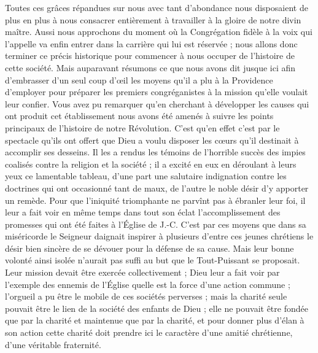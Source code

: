 Toutes ces grâces répandues sur nous avec tant d'abondance nous disposaient de plus en plus à nous consacrer entièrement à travailler à la gloire de notre divin maître. Aussi nous approchons du moment où la Congrégation fidèle à la voix qui l'appelle va enfin entrer dans la carrière qui lui est réservée ; nous allons donc terminer ce précis historique pour commencer à nous occuper de l'histoire de cette société. Mais auparavant résumons ce que nous avons dit jusque ici afin d'embrasser d'un seul coup d'œil les moyens qu'il a plu à la Providence d'employer pour préparer les
premiers congréganistes à la mission qu'elle voulait leur confier. Vous avez pu remarquer qu'en cherchant à développer les causes qui ont produit cet établissement nous avons été amenés à suivre les points principaux de l'histoire de notre Révolution. C'est qu'en effet c'est par le spectacle qu'ils ont offert que Dieu a voulu disposer les cœurs qu'il destinait à accomplir ses desseins. Il les a rendus les témoins de l'horrible succès des impies coalisés contre la religion et la société ; il a excité en eux en déroulant à leurs yeux ce lamentable tableau, d'une part une salutaire indignation contre les doctrines qui ont occasionné tant de maux, de l'autre le noble désir d'y apporter un remède. Pour que l'iniquité triomphante ne parvînt pas à ébranler leur foi, il leur a fait voir en même temps dans tout son éclat l'accomplissement des promesses qui ont été faites à l'Église de J.-C. C'est par ces moyens que dans sa miséricorde le Seigneur daignait inspirer à plusieurs d'entre ces jeunes chrétiens le désir bien sincère de se dévouer pour la défense de sa cause. Mais leur bonne volonté ainsi isolée n'aurait pas suffi au but que le Tout-Puissant se proposait. Leur mission devait être exercée collectivement ; Dieu leur a fait voir par l'exemple des ennemis de l'Église quelle est la force d'une action commune ; l'orgueil a pu être le mobile de ces sociétés perverses ; mais la charité seule pouvait être le lien de la société
des enfants de Dieu ; elle ne pouvait être fondée que par la charité et maintenue que par la charité, et pour donner plus d'élan à son action cette charité doit prendre ici le caractère d'une amitié chrétienne, d'une véritable fraternité.

